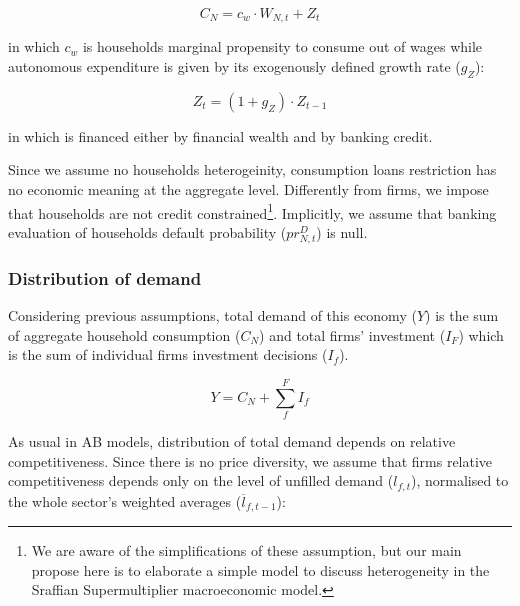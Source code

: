 \documentclass{SelfArx}
\begin{document}
\begin{latex}
\begin{equation}
C_{N} = c_{w}\cdot W_{N,t} + Z_{t}
\end{equation}
\end{latex}
in which \(c_{w}\) is households marginal propensity to consume out of wages while autonomous expenditure is given by its exogenously defined growth rate (\(g_{Z}\)):
\begin{latex}
\begin{equation}
Z_{t} = (1+g_{Z})\cdot Z_{t-1}
\end{equation}
\end{latex}
in which is financed either by financial wealth and by banking credit.

Since we assume no households heterogeinity, consumption loans restriction has no economic meaning at the aggregate level.
Differently from firms, we impose that households are not credit constrained\footnote{We are aware of the simplifications of these assumption, but our main propose here is to elaborate a simple model to discuss heterogeneity in the Sraffian Supermultiplier macroeconomic model.}.
Implicitly, we assume that banking evaluation of households default probability (\(pr^{D}_{N,t}\)) is null.

\subsubsection*{Distribution of demand}
\label{sec:orge49c46f}


Considering previous assumptions, total demand of this economy (\(Y\)) is the sum of aggregate household consumption (\(C_{N}\)) and total firms' investment (\(I_{F}\)) which is the sum of individual firms investment decisions (\(I_{f}\)).
\begin{latex}
\begin{equation}
\label{EQ_GDP_D}
Y = C_{N} + \sum_{f}^{F} I_{f}
\end{equation}
\end{latex}
As usual in AB models, distribution of total demand depends on relative competitiveness.
Since there is no price diversity, we assume that firms relative competitiveness depends only on the level of unfilled demand (\(l_{f,t}\)), normalised to the whole sector’s weighted averages (\(\overline{l}_{f,t-1}\)):
\end{document}
